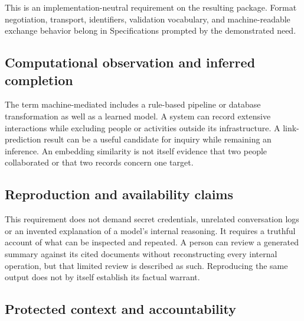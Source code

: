 \documentclass[11pt,a4paper]{article}
\begin{document}
This is an implementation-neutral requirement on the resulting package. Format negotiation, transport, identifiers, validation vocabulary, and machine-readable exchange behavior belong in Specifications prompted by the demonstrated need.


\subsection{Computational observation and inferred completion}

The term machine-mediated includes a rule-based pipeline or database transformation as well as a learned model. A system can record extensive interactions while excluding people or activities outside its infrastructure. A link-prediction result can be a useful candidate for inquiry while remaining an inference. An embedding similarity is not itself evidence that two people collaborated or that two records concern one target.

\subsection{Reproduction and availability claims}

This requirement does not demand secret credentials, unrelated conversation logs or an invented explanation of a model's internal reasoning. It requires a truthful account of what can be inspected and repeated. A person can review a generated summary against its cited documents without reconstructing every internal operation, but that limited review is described as such. Reproducing the same output does not by itself establish its factual warrant.

\subsection{Protected context and accountability}
\end{document}
